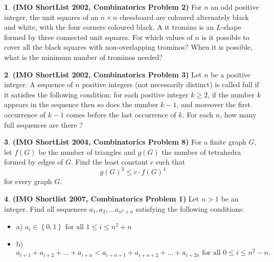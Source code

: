 \documentclass{article}
\newcommand{\plus}{+}
\newcommand{\minus}{-}
\theoremstyle{definition}
\newtheorem{p}{}
\begin{document}
\begin{p}{\bf(IMO ShortList 2002, Combinatorics Problem 2)}
For $n$ an odd positive integer, the unit squares of an $n\times n$ chessboard are coloured alternately black and white, with the four corners coloured black. A it tromino is an $L$-shape formed by three connected unit squares. For which values of $n$ is it possible to cover all the black squares with non-overlapping trominos?  When it is possible, what is the minimum number of trominos needed?
\end{p}




\begin{p}{\bf(IMO ShortList 2002, Combinatorics Problem 3)}
Let $n$ be a positive integer. A sequence of $n$ positive integers (not necessarily distinct) is called full if it satisfies the following condition: for each positive integer $k\geq2$, if the number $k$ appears in the sequence then so does the number $k-1$, and moreover the first occurrence of $k-1$ comes before the last occurrence of $k$. For each $n$, how many full sequences are there ?
\end{p}





\begin{p}{\bf (IMO ShortList 2004, Combinatorics Problem 8)}
For a finite graph $G$, let $f(G)$ be the number of triangles and $g(G)$ the number of tetrahedra formed by edges of $G$. Find the least constant $c$ such that
\[
g(G)^3\le c\cdot f(G)^4
\]
for every graph $G$.
\end{p}





\begin{p}{\bf (IMO Shortlist 2007, Combinatorics Problem 1)}
Let $ n > 1$ be an integer. Find all sequences $ a_1, a_2, \ldots a_{n^2 \plus{} n}$ satisfying the following conditions:
\begin{itemize}
\item a) $a_i \in \left\{0,1\right\} \text{ for all } 1 \leq i \leq n^2 \plus{} n$
\item b) $a_{i \plus{} 1} \plus{} a_{i \plus{} 2} \plus{} \ldots \plus{} a_{i \plus{} n} < a_{i \plus{} n \plus{} 1} \plus{} a_{i \plus{} n \plus{} 2} \plus{} \ldots \plus{} a_{i \plus{} 2n} \text{ for all } 0 \leq i \leq n^2 \minus{} n.$
\end{itemize}
\end{p}
\end{document}
